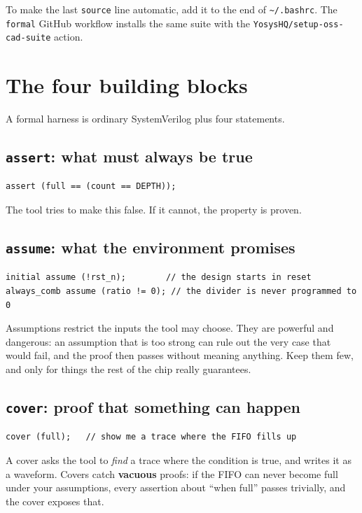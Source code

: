 \documentclass[11pt,a4paper]{article}
\newcommand{\file}[1]{\texttt{#1}}
\begin{document}
To make the last \texttt{source} line automatic, add it to the end of \file{\textasciitilde/.bashrc}. The \file{formal} GitHub workflow installs the same suite with the \texttt{YosysHQ/setup-oss-cad-suite} action.

\section{The four building blocks}

A formal harness is ordinary SystemVerilog plus four statements.

\subsection{\texttt{assert}: what must always be true}
\begin{lstlisting}
assert (full == (count == DEPTH));
\end{lstlisting}
The tool tries to make this false. If it cannot, the property is proven.

\subsection{\texttt{assume}: what the environment promises}
\begin{lstlisting}
initial assume (!rst_n);        // the design starts in reset
always_comb assume (ratio != 0); // the divider is never programmed to 0
\end{lstlisting}
Assumptions restrict the inputs the tool may choose. They are powerful and dangerous: an assumption that is too strong can rule out the very case that would fail, and the proof then passes without meaning anything. Keep them few, and only for things the rest of the chip really guarantees.

\subsection{\texttt{cover}: proof that something can happen}
\begin{lstlisting}
cover (full);   // show me a trace where the FIFO fills up
\end{lstlisting}
A cover asks the tool to \emph{find} a trace where the condition is true, and writes it as a waveform. Covers catch \textbf{vacuous} proofs: if the FIFO can never become full under your assumptions, every assertion about ``when full'' passes trivially, and the cover exposes that.
\end{document}
